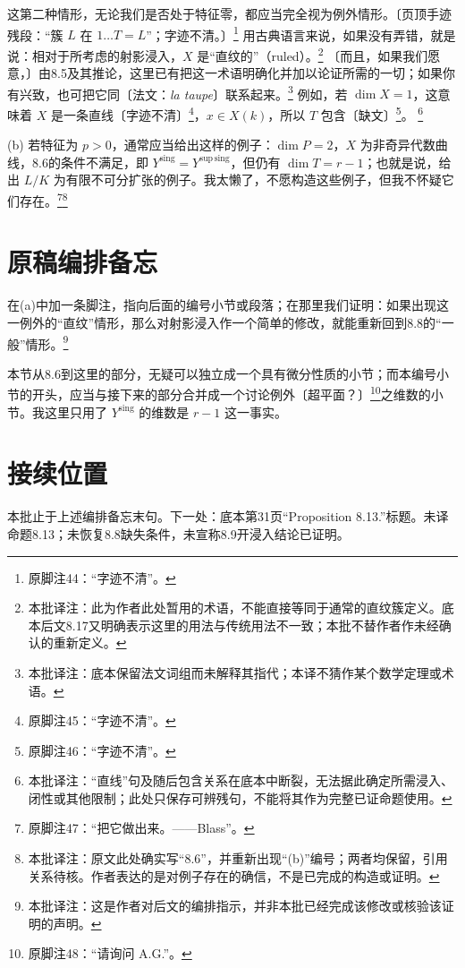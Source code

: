 \documentclass[openany]{ctexbook}
\newcommand{\note}[1]{\footnote{本批译注：#1}}
\newcommand{\Ys}{Y^{\mathrm{sing}}}
\newcommand{\Yss}{Y^{\mathrm{sup\,sing}}}
\begin{document}
这第二种情形，无论我们是否处于特征零，都应当完全视为例外情形。〔页顶手迹残段：“簇 $L$ 在 $1\ldots T=L$”；字迹不清。〕\footnote{原脚注44：“字迹不清”。}
用古典语言来说，如果没有弄错，就是说：相对于所考虑的射影浸入，$X$ 是“直纹的”（ruled）。\note{此为作者此处暂用的术语，不能直接等同于通常的直纹簇定义。底本后文8.17又明确表示这里的用法与传统用法不一致；本批不替作者作未经确认的重新定义。}
〔而且，如果我们愿意，〕由8.5及其推论，这里已有把这一术语明确化并加以论证所需的一切；如果你有兴致，也可把它同〔法文：\emph{la taupe}〕联系起来。\note{底本保留法文词组而未解释其指代；本译不猜作某个数学定理或术语。}
例如，若 $\dim X=1$，这意味着 $X$ 是一条直线〔字迹不清〕\footnote{原脚注45：“字迹不清”。}，$x\in X(k)$，所以 $T$ 包含〔缺文〕\footnote{原脚注46：“字迹不清”。}。
\note{“直线”句及随后包含关系在底本中断裂，无法据此确定所需浸入、闭性或其他限制；此处只保存可辨残句，不能将其作为完整已证命题使用。}

(b) 若特征为 $p>0$，通常应当给出这样的例子：$\dim P=2$，$X$ 为非奇异代数曲线，8.6的条件不满足，即 $\Ys=\Yss$，但仍有 $\dim T=r-1$；也就是说，给出 $L/K$ 为有限不可分扩张的例子。我太懒了，不愿构造这些例子，但我不怀疑它们存在。\footnote{原脚注47：“把它做出来。——Blass”。}\note{原文此处确实写“8.6”，并重新出现“(b)”编号；两者均保留，引用关系待核。作者表达的是对例子存在的确信，不是已完成的构造或证明。}

\section*{原稿编排备忘}
在(a)中加一条脚注，指向后面的编号小节或段落；在那里我们证明：如果出现这一例外的“直纹”情形，那么对射影浸入作一个简单的修改，就能重新回到8.8的“一般”情形。\note{这是作者对后文的编排指示，并非本批已经完成该修改或核验该证明的声明。}

本节从8.6到这里的部分，无疑可以独立成一个具有微分性质的小节；而本编号小节的开头，应当与接下来的部分合并成一个讨论例外〔超平面？〕\footnote{原脚注48：“请询问 A.G.”。}之维数的小节。我这里只用了 $\Ys$ 的维数是 $r-1$ 这一事实。

\section*{接续位置}
本批止于上述编排备忘末句。下一处：底本第31页“Proposition 8.13.”标题。未译命题8.13；未恢复8.8缺失条件，未宣称8.9开浸入结论已证明。
\end{document}

